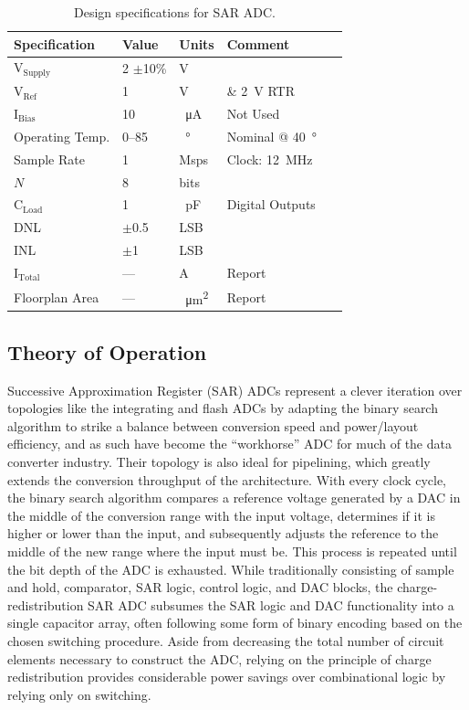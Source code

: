 \documentclass[11pt,letterpaper]{article}
\begin{document}
\begin{table}[ht]
    \centering
    \begin{tabular}{lllll}
    \toprule
        \textbf{Specification} & \textbf{Value} & \textbf{Units} & \textbf{Comment} \\
    \midrule
        \(\mathrm{V_{Supply}}\) & 2 \(\pm\)10\% & V & \\
        \(\mathrm{V_{Ref}}\) & 1 & V & \& \qty{2}{\V} RTR\\
        \(\mathrm{I_{Bias}}\) & 10 & \qty{}{\uA} & Not Used \\
        Operating Temp. & \SIrange{0}{85}{} & \qty{}{\degree\C} & Nominal @ \qty{40}{\degree\C} \\
        Sample Rate & 1 & Msps & Clock: \qty{12}{\MHz} \\
        \(N\) & 8 & bits & \\
        \(\mathrm{C_{Load}}\) & 1 & \qty{}{\pF} & Digital Outputs \\
        DNL & \(\pm\)0.5 & LSB & \\
        INL & \(\pm\)1 & LSB & \\
        \(\mathrm{I_{Total}}\) & --- & A & Report \\
        Floorplan Area & --- & \qty{}{\um\squared} & Report \\
    \bottomrule
    \end{tabular}
    \caption{Design specifications for SAR ADC.}\label{tab:design_req}
\end{table}

\subsection{Theory of Operation}

Successive Approximation Register (SAR) ADCs represent a clever iteration over topologies like the integrating and flash ADCs by adapting the binary search algorithm to strike a balance between conversion speed and power/layout efficiency, and as such have become the ``workhorse'' ADC for much of the data converter industry. Their topology is also ideal for pipelining, which greatly extends the conversion throughput of the architecture. With every clock cycle, the binary search algorithm compares a reference voltage generated by a DAC in the middle of the conversion range with the input voltage, determines if it is higher or lower than the input, and subsequently adjusts the reference to the middle of the new range where the input must be. This process is repeated until the bit depth of the ADC is exhausted. While traditionally consisting of sample and hold, comparator, SAR logic, control logic, and DAC blocks, the charge-redistribution SAR ADC subsumes the SAR logic and DAC functionality into a single capacitor array, often following some form of binary encoding based on the chosen switching procedure. Aside from decreasing the total number of circuit elements necessary to construct the ADC, relying on the principle of charge redistribution provides considerable power savings over combinational logic by relying only on switching. 
\end{document}
